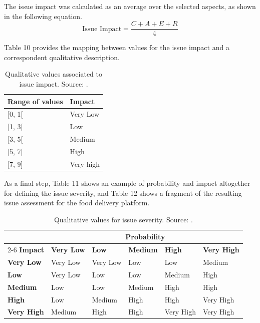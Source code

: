 \documentclass[preprint,10pt]{elsarticle}
\begin{document}
The issue impact was calculated as an average over the selected aspects, as shown in the following equation.
\begin{equation}
    \text{Issue Impact} = \frac{C+A+E+R}{4}
\end{equation}

Table 10 provides the mapping between values for the issue impact and a correspondent qualitative description.

\begin{table}[h!]
    \caption{Qualitative values associated to issue impact. Source: .}
    \label{tab:10}
    \centering
    \begin{tabular}{ll}
        \toprule
        \textbf{Range of values} & \textbf{Impact} \\
        \midrule
        {[}0, 1{[} & Very Low \\
        {[}1, 3{[} & Low \\
        {[}3, 5{[} & Medium \\
        {[}5, 7{[} & High \\
        {[}7, 9{]} & Very high \\
        \bottomrule
    \end{tabular}
\end{table}

As a final step, Table 11 shows an example of probability and impact altogether for defining the issue severity, and Table 12 shows a fragment of the resulting issue assessment for the food delivery platform.

\begin{table}[h!]
    \caption{Qualitative values for issue severity. Source: .}
    \label{tab:11}
    \centering
    \begin{tabular}{@{}llllll@{}}
        \toprule
        & \multicolumn{5}{c}{\textbf{Probability}} \\
        \cmidrule(lr){2-6}
        \textbf{Impact} & \textbf{Very Low} & \textbf{Low} & \textbf{Medium} & \textbf{High} & \textbf{Very High} \\
        \midrule
        \textbf{Very Low} & Very Low & Very Low & Low & Low & Medium \\
        \textbf{Low} & Very Low & Low & Low & Medium & High \\
        \textbf{Medium} & Low & Low & Medium & High & High \\
        \textbf{High} & Low & Medium & High & High & Very High \\
        \textbf{Very High} & Medium & High & High & Very High & Very High \\
        \bottomrule
    \end{tabular}
\end{table}
\end{document}

